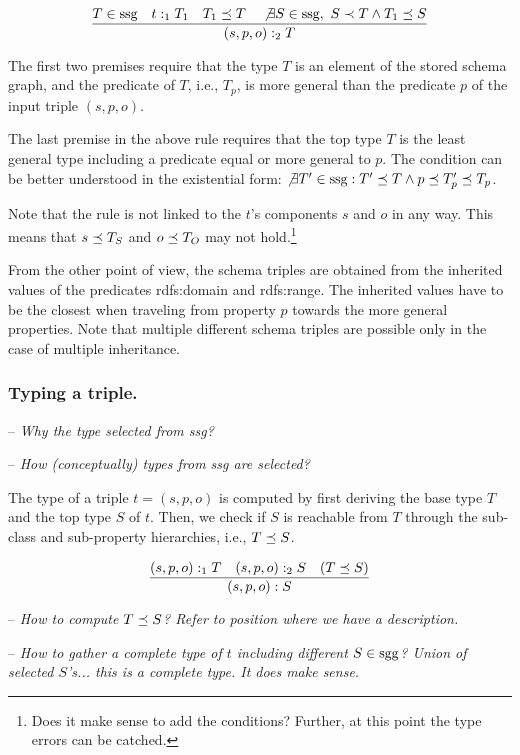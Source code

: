 \documentclass[runningheads]{llncs}
\newcommand{\nl}{\hfill\break}
\newcommand{\notes}[1]{\noindent\begin{small}-- \emph{#1}\\\end{small}}
\begin{document}
\begin{equation}
\dfrac{T\in\/\text{ssg}\quad\/t:_1T_1\quad\/T_1\preceq\/T\quad  
       \not\exists\/S\in\/\text{ssg},\ S\prec\/T \land T_1\preceq\/S}
      {(s,p,o):_2\/T}
\end{equation}

The first two premises require that the type $T$ is an element of the
stored schema graph, and the predicate of $T$, i.e., $T_p$, is more
general than the predicate $p$ of the input triple $(s,p,o)$.

The last premise in the above rule requires that the top type $T$ is
the least general type including a predicate equal or more general to
$p$. The condition can be better understood in the existential form:
$\not\exists\/T'\in \text{ssg}: T'\preceq\/T\land
p\preceq\/T'_p\preceq\/T_p$.

Note that the rule is not linked to the $t$'s components $s$ and
$o$ in any way. This means that $s\preceq\/T_S$ and $o\preceq\/T_O$
may not hold.\footnote{Does it make sense to add the conditions? Further, at
this point the type errors can be catched.}

From the other point of view, the schema triples are obtained from the
inherited values of the predicates rdfs:domain and rdfs:range. The
inherited values have to be the closest when traveling from property
$p$ towards the more general properties. Note that multiple different
schema triples are possible only in the case of multiple inheritance.


\subsubsection{Typing a triple.}\nl

\notes{Why the type selected from ssg? }
\notes{How (conceptually) types from ssg are selected?}

The type of a triple $t=(s,p,o)$ is computed by first deriving the
base type $T$ and the top type $S$ of $t$. Then, we check if $S$ is
reachable from $T$ through the sub-class and sub-property hierarchies,
i.e., $T\preceq\/S$.

\begin{equation}
\dfrac{(s,p,o):_1T\quad (s,p,o):_2S\quad (T\preceq\/S)}
      {(s,p,o):S}
\end{equation}

\notes{How to compute $T\preceq\/S$? Refer to position where we have a description.}
\notes{How to gather a complete type of $t$ including different
$S\in\/\text{sgg}$? Union of selected $S$'s... this is a
\emph{complete} type. It does make sense.}
\end{document}

